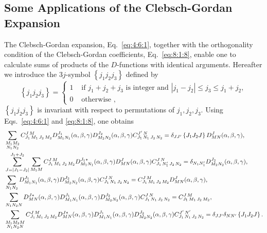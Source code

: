 \subsection{Some Applications of the Clebsch-Gordan Expansion}\label{sec:4.6.2}
The Clebsch-Gordan expansion, Eq.~\eqref{eq:4:6:1}, together with the orthogonality condition of the Clebsch-Gordan coefficients, Eq.~\eqref{eq:8:1:8}, enable one to calculate sums of products of the $D$-functions with identical arguments. Hereafter we introduce the $3 j$-symbol $\left\{j_{1} j_{2} j_{3}\right\}$ defined by
\begin{equation}
\left\{j_{1} j_{2} j_{3}\right\}= \begin{cases}1 & \text { if } j_{1}+j_{2}+j_{3} \text { is integer and }\left|j_{1}-j_{2}\right| \leq j_{3} \leq j_{1}+j_{2},  \label{eq:4:6:2}\\ 0 & \text { otherwise },\end{cases}
\end{equation}
$\left\{j_{1} j_{2} j_{3}\right\}$ is invariant with respect to permutations of $j_{1}, j_{2}, j_{3}$. Using Eqs.~\eqref{eq:4:6:1} and \eqref{eq:8:1:8}, one obtains
\begin{align}
& \sum_{\substack{M_{1} M_{2} \\
N_{1} N_{2}}} C_{J_{1}\,M_{1}\,J_{2}\,M_{2}}^{J\,M} D_{M_{1} N_{1}}^{J_{1}}(\alpha, \beta, \gamma) D_{M_{2} N_{2}}^{J_{2}}(\alpha, \beta, \gamma) C_{J_{1}\,N_{1}\,J_{2}\,N_{2}}^{J^{\prime}\,N}=\delta_{J J^{\prime}}\left\{J_{1} J_{2} J\right\} D_{M N}^{J}(\alpha, \beta, \gamma)  ,\label{eq:4:6:3}\\
&  \sum_{J=\left|J_{1}-J_{2}\right|}^{J_{1}+J_{2}} \sum_{M_{1} M} C_{J_{1}\,M_{1}\,J_{2}\,M_{2}}^{J\,M} D_{M_{1} N_{1}}^{J_{1} *}(\alpha, \beta, \gamma) D_{M N}^{J}(\alpha, \beta, \gamma) C_{J_{1}\,N_{1}^{\prime}\,J_{2}\,N_{2}}^{J\,N}=\delta_{N_{1} N_{1}^{\prime}} D_{M_{2} N_{2}}^{J_{2}}(\alpha, \beta, \gamma)  ,\label{eq:4:6:4}\\
& \sum_{N_{1} N_{2}} D_{M_{1} N_{1}}^{J_{1}}(\alpha, \beta, \gamma) D_{M_{2} N_{2}}^{J_{2}}(\alpha, \beta, \gamma) C_{J_{1}\,N_{1}\,J_{2}\,N_{2}}^{J\,N}=C_{J_{1}\,M_{1}\,J_{2}\,M_{2}}^{J\,M} D_{M N}^{J}(\alpha, \beta, \gamma) , \label{eq:4:6:5}\\
& \sum_{N_{1} N_{2} N} D_{M N}^{J *}(\alpha, \beta, \gamma) D_{M_{1} N_{1}}^{J_{1}}(\alpha, \beta, \gamma) D_{M_{2} N_{2}}^{J_{2}}(\alpha, \beta, \gamma) C_{J_{1}\,N_{1}\,J_{2}\,N_{2}}^{J\,N}=C_{J_{1}\,M_{1}\,J_{2}\,M_{2}}^{J\,M}, \label{eq:4:6:6}\\
&\sum_{\substack{M_1M_2M\\N_1N_2N}}
C_{J_{1}\,M_{1}\,J_{2}\,M_{2}}^{J\,M}
 D_{M N}^{J *}(\alpha, \beta, \gamma) D_{M_{1} N_{1}}^{J_{1}}(\alpha, \beta, \gamma) D_{M_{2} N_{2}}^{J_{2}}(\alpha, \beta, \gamma) C_{J_{1}\,N_{1}\,J_{2}\,N_{2}}^{J^{\prime}\,N^{\prime}}=\delta_{J J^{\prime}} \delta_{N N^{\prime}}\left\{J_{1} J_{2} J\right\}. \label{eq:4:6:7}
\end{align}
